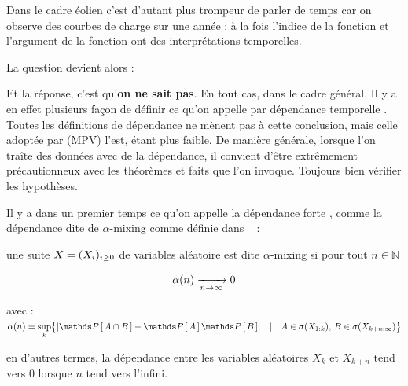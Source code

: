 \bigskip

Dans le cadre éolien c'est d'autant plus trompeur de parler de temps car on observe des courbes de charge sur une année : à la fois l'indice de la fonction et l'argument de la fonction ont des interprétations temporelles.

\smallskip

\noindent{}

\bigskip

\noindent La question devient alors :

\noindent Et la réponse, c'est qu'\textbf{on ne sait pas}. En tout cas, dans le cadre général. Il y a en effet plusieurs façon de définir ce qu'on appelle par \og dépendance temporelle \fg. Toutes les définitions de dépendance ne mènent pas à cette conclusion, mais celle adoptée par (MPV) l'est, étant plus faible. De manière générale, lorsque l'on traîte des données avec de la dépendance, il convient d'être extrêmement précautionneux avec les théorèmes et \og faits \fg que l'on invoque. Toujours bien vérifier les hypothèses.

Il y a dans un premier temps ce qu'on appelle la dépendance \og forte \fg, comme la dépendance dite de \og $\alpha$-mixing \fg comme définie dans ~\cite{estimation-dependent-strong-mixing} :


\begin{definition*}
    
    une suite $X = ( {X}_{i})_{i \geq 0}$ de variables aléatoire est dite $\alpha$-mixing si pour tout $n \in \mathds N$ 
    
    
    $$
    \alpha(n) \xrightarrow[ n \rightarrow \infty ]{} 0
    $$
    
    avec : $\alpha(n) = \sup\limits_k \bigl\{ \lvert \proba{A \cap B} - \proba{A}\proba{B} \rvert \quad | \quad A \in \sigma( X_{1:k} ), \, B \in \sigma(X_{k+n : \infty}) \bigr\}$
    
    en d'autres termes, la \og dépendance \fg {} entre les variables aléatoires $X_k$ et $X_{k+n}$ tend vers 0 lorsque $n$ tend vers l'infini.
\end{definition*}

